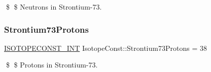 \$ \$ Neutrons in Strontium-\/73. \mbox{\label{group___isotope_const-_strontium-_sr73_ga0a222355f994726c59b9d6c38116fb4c}} 
\subsubsection{\texorpdfstring{Strontium73\+Protons}{Strontium73Protons}}
{\footnotesize\ttfamily \mbox{\hyperlink{group___isotope_const-_macros_ga5f18360b3e99483a35c32d789e62621c}{I\+S\+O\+T\+O\+P\+E\+C\+O\+N\+S\+T\+\_\+\+I\+NT}} Isotope\+Const\+::\+Strontium73\+Protons = 38}

\$ \$ Protons in Strontium-\/73. 